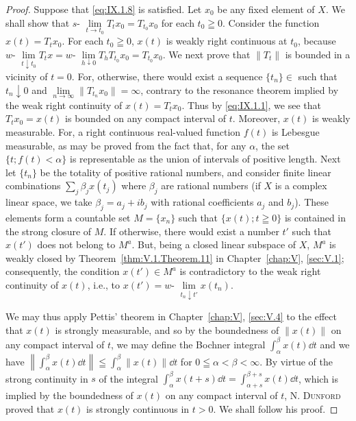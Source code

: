 \begin{proof}
 Suppose that \eqref{eq:IX.1.8} is satisfied. Let $x_0$ be any fixed element of $X$. We shall show that $s\text{- }\lim\limits_{t \to t_0} T_t x_0 = T_{t_0} x_0$ for each $t_0 \geqq 0$. Consider the function $x(t) = T_t x_0$. For each $t_0 \geqq 0$, $x(t)$ is weakly right continuous at $t_0$, because $w\text{- }\lim\limits_{t \downarrow t_0} T_t x = w\text{- }\lim\limits_{h \downarrow 0} T_h T_{t_0} x_0 = T_{t_0} x_0$. We next prove that $\|T_t\|$ is bounded in a vicinity of $t = 0$. For, otherwise, there would exist a sequence $\{t_n\} \in$ such that $t_n \downarrow 0$ and $\lim\limits_{n \to \infty} \|T_{t_{n}} x_0\| = \infty$, contrary to the resonance theorem implied by the weak right continuity of $x(t) = T_t x_0$. Thus by \eqref{eq:IX.1.1}, we see that $T_t x_0 = x(t)$ is bounded on any compact interval of $t$. Moreover, $x(t)$ is weakly measurable. For, a right continuous real-valued function $f(t)$ is Lebesgue measurable, as may be proved from the fact that, for any $\alpha$, the set $\{t; f(t) < \alpha\}$ is representable as the union of intervals of positive length. Next let $\{t_n\}$ be the totality of positive rational numbers, and consider finite linear combinations $\sum\limits_j \beta_j x(t_j)$ where $\beta_j$ are rational numbers (if $X$ is a complex linear space, we take $\beta_j = a_j + ib_j$ with rational coefficients $a_j$ and $b_j$). These elements form a countable set $M = \{x_n\}$ such that $\{x(t); t \geqq 0\}$ is contained in the strong closure of $M$. If otherwise, there would exist a number $t'$ such that $x(t')$ does not belong to $M^a$. But, being a closed linear subspace of $X$, $M^a$ is weakly closed by Theorem~\ref{thm:V.1.Theorem.11} in Chapter~\ref{chap:V}, \ref{sec:V.1}; consequently, the condition $x(t') \in M^a$ is contradictory to the weak right continuity of $x(t)$, i.e., to $x(t') = w\text{- }\lim\limits_{t_n \downarrow t'} x(t_n)$. 

We may thus apply Pettis' theorem in Chapter~\ref{chap:V}, \ref{sec:V.4} to the effect that $x(t)$ is strongly measurable, and so by the boundedness of $\|x(t)\|$ on any compact interval of $t$, we may define the Bochner integral $\int_{\alpha}^{\beta} x(t) \dd t$ and we have $\left\| \int_{\alpha}^{\beta} x(t) \dd t \right\| \leqq \int_{\alpha}^{\beta} \|x(t)\| \dd t$ for $0 \leqq \alpha < \beta < \infty$. By virtue of the strong continuity in $s$ of the integral $\int_{\alpha}^{\beta} x(t + s) \dd t = \int_{\alpha + s}^{\beta + s} x(t) \dd t$, which is implied by the boundedness of $x(t)$ on any compact interval of $t$, N. \textsc{Dunford} \cite{dunford46} proved that $x(t)$ is strongly continuous in $t > 0$. We shall follow his proof. 


\end{proof}
